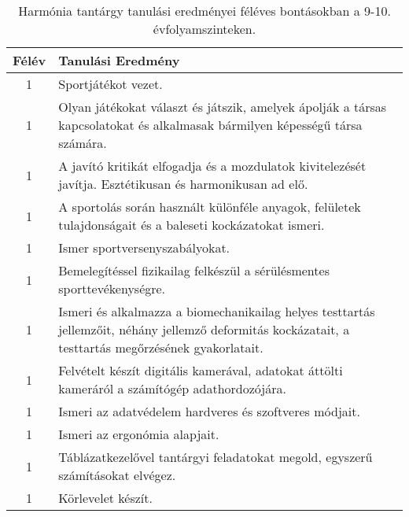        
           \begin{longtable}{c | p{12cm} }
            \caption[Harmónia 9-10.]{Harmónia tantárgy tanulási eredményei féléves bontásokban a 9-10. évfolyamszinteken. }  \\

            \textbf{Félév} & \textbf{Tanulási Eredmény} \\
            \hline
            \endhead
                                
                                      
                                
                                          1 &  Sportjátékot vezet. \\ \hline
                                          1 &  Olyan játékokat választ és játszik, amelyek ápolják a társas kapcsolatokat és alkalmasak bármilyen képességű társa számára. \\ \hline
                                          1 &  A javító kritikát elfogadja és a mozdulatok kivitelezését javítja. Esztétikusan és harmonikusan ad elő. \\ \hline
                                          1 &  A sportolás során használt különféle anyagok, felületek tulajdonságait és a baleseti kockázatokat ismeri. \\ \hline
                                          1 &  Ismer sportversenyszabályokat. \\ \hline
                                          1 &  Bemelegítéssel fizikailag felkészül a sérülésmentes sporttevékenységre. \\ \hline
                                          1 &  Ismeri és alkalmazza a biomechanikailag helyes testtartás jellemzőit, néhány jellemző deformitás kockázatait, a testtartás megőrzésének gyakorlatait. \\ \hline
                                          1 &  Felvételt készít digitális kamerával, adatokat áttölti kameráról a számítógép adathordozójára. \\ \hline
                                          1 &  Ismeri az adatvédelem hardveres és szoftveres módjait. \\ \hline
                                          1 &  Ismeri az ergonómia alapjait. \\ \hline
                                          1 &  Táblázatkezelővel tantárgyi feladatokat megold, egyszerű számításokat elvégez. \\ \hline
                                          1 &  Körlevelet készít. \\ \hline

\end{longtable}
